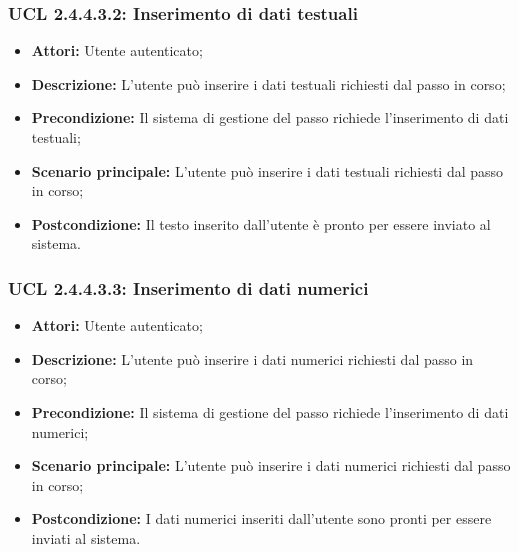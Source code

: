 \hypertarget{L2.4.4.3.2}{}
\subsubsection{UCL 2.4.4.3.2: Inserimento di dati testuali}
\begin{itemize}
\item \textbf{Attori:} Utente autenticato;
\item \textbf{Descrizione:} L'utente può inserire i dati testuali richiesti dal passo in corso;
\item \textbf{Precondizione:} Il sistema di gestione del passo richiede l'inserimento di dati testuali;
\item \textbf{Scenario principale:} L'utente può inserire i dati testuali richiesti dal passo in corso;
\item \textbf{Postcondizione:} Il testo inserito dall'utente è pronto per essere inviato al sistema.
\end{itemize}

\hypertarget{L2.4.4.3.3}{}
\subsubsection{UCL 2.4.4.3.3: Inserimento di dati numerici}
\begin{itemize}
\item \textbf{Attori:} Utente autenticato;
\item \textbf{Descrizione:} L'utente può inserire i dati numerici richiesti dal passo in corso;
\item \textbf{Precondizione:} Il sistema di gestione del passo richiede l'inserimento di dati numerici;
\item \textbf{Scenario principale:} L'utente può inserire i dati numerici richiesti dal passo in corso;
\item \textbf{Postcondizione:} I dati numerici inseriti dall'utente sono pronti per essere inviati al sistema.
\end{itemize}

